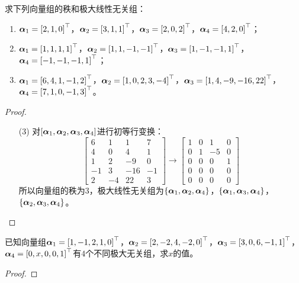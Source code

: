 \begin{problem}\label{problem-2.26}
求下列向量组的秩和极大线性无关组：
\begin{enumerate}
    \item \(\boldsymbol{\alpha}_1=\left[ 2,1,0 \right]^\top\)，\(\boldsymbol{\alpha}_2=\left[ 3,1,1 \right]^\top\)，\(\boldsymbol{\alpha}_3=\left[ 2,0,2 \right]^\top\)，\(\boldsymbol{\alpha}_4=\left[ 4,2,0 \right]^\top\)；
    \item \(\boldsymbol{\alpha}_1=\left[ 1,1,1,1 \right]^\top\)，\(\boldsymbol{\alpha}_2=\left[ 1,1,-1,-1 \right]^\top\)，\(\boldsymbol{\alpha}_3=\left[ 1,-1,-1,1 \right]^\top\)，\(\boldsymbol{\alpha}_4=\left[ -1,-1,-1,1 \right]^\top\)；
    \item \(\boldsymbol{\alpha}_1=\left[ 6,4,1,-1,2 \right]^\top\)，\(\boldsymbol{\alpha}_2=\left[ 1,0,2,3,-4 \right]^\top\)，\(\boldsymbol{\alpha}_3=\left[ 1,4,-9,-16,22 \right]^\top\)，\(\boldsymbol{\alpha}_4=\left[ 7,1,0,-1,3 \right]^\top\)。
\end{enumerate}
\end{problem}
\begin{proof}
    \begin{enumerate}
        \item[(3)] 对\(\left[ \boldsymbol{\alpha}_{1},\boldsymbol{\alpha}_{2},\boldsymbol{\alpha}_{3},\boldsymbol{\alpha}_{4} \right]\)进行初等行变换：
              \begin{equation*}
                  \begin{bmatrix}
                      6  & 1  & 1   & 7  \\
                      4  & 0  & 4   & 1  \\
                      1  & 2  & -9  & 0  \\
                      -1 & 3  & -16 & -1 \\
                      2  & -4 & 22  & 3
                  \end{bmatrix}\longrightarrow
                  \begin{bmatrix}
                      1 & 0 & 1  & 0 \\
                      0 & 1 & -5 & 0 \\
                      0 & 0 & 0  & 1 \\
                      0 & 0 & 0  & 0 \\
                      0 & 0 & 0  & 0
                  \end{bmatrix}
              \end{equation*}
              所以向量组的秩为\(3\)，极大线性无关组为\(\left\{\boldsymbol{\alpha}_{1},\boldsymbol{\alpha}_{2},\boldsymbol{\alpha}_{4} \right\}\)，\(\left\{\boldsymbol{\alpha}_{1},\boldsymbol{\alpha}_{3},\boldsymbol{\alpha}_{4} \right\}\)，\(\left\{\boldsymbol{\alpha}_{2},\boldsymbol{\alpha}_{3},\boldsymbol{\alpha}_{4} \right\}\)。
    \end{enumerate}
\end{proof}

\begin{problem}\label{problem-2.27}
已知向量组\(\boldsymbol{\alpha}_1=\left[ 1,-1,2,1,0 \right]^\top\)，\(\boldsymbol{\alpha}_2=\left[ 2,-2,4,-2,0 \right]^\top\)，\(\boldsymbol{\alpha}_3=\left[ 3,0,6,-1,1 \right]^\top\)，\(\boldsymbol{\alpha}_4=\left[ 0,x,0,0,1 \right]^\top\)有\(4\)个不同极大无关组，求\(x\)的值。
\end{problem}
\begin{proof}
\end{proof}

